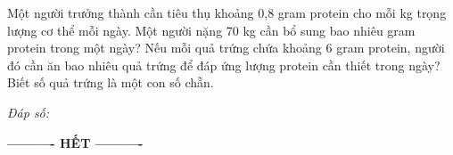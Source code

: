 \documentclass[11pt,a4paper]{article}
\def\loigiai#1{}
\begin{document}
\begin{ex}
Một người trưởng thành cần tiêu thụ khoảng 0,8 gram protein cho mỗi kg trọng lượng cơ thể mỗi ngày. Một người nặng 70 kg cần bổ sung bao nhiêu gram protein trong một ngày? Nếu mỗi quả trứng chứa khoảng 6 gram protein, người đó cần ăn bao nhiêu quả trứng để đáp ứng lượng protein cần thiết trong ngày? Biết số quả trứng là một con số chẵn.
\loigiai{}
\end{ex}
\noindent\textit{Đáp số:} \dotfill\vspace{0.25cm}

\vspace{0.1cm}
\begin{center}
	\textbf{---------- HẾT ----------}
\end{center}
\end{document}
